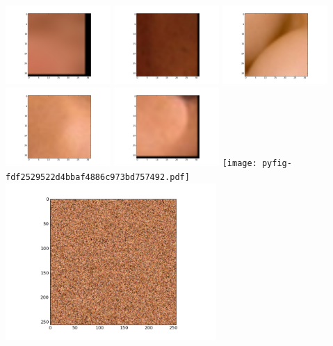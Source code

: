 \documentclass{report}
\begin{document}
\clearpage%
\includegraphics[width=4cm]{dbshow-1-0.png}
\clearpage%
\includegraphics[width=4cm]{dbshow-1-1.png}
\clearpage%
\includegraphics[width=4cm]{dbshow-1-2.png}
\clearpage%
\includegraphics[width=4cm]{dbshow-1-3.png}
\clearpage%
\includegraphics[width=4cm]{dbshow-1-4.png}
\clearpage%
\texttt{[image: pyfig-fdf2529522d4bbaf4886c973bd757492.pdf]}
\clearpage%
\includegraphics[width=8cm]{skinhisto000.png}
\end{document}
